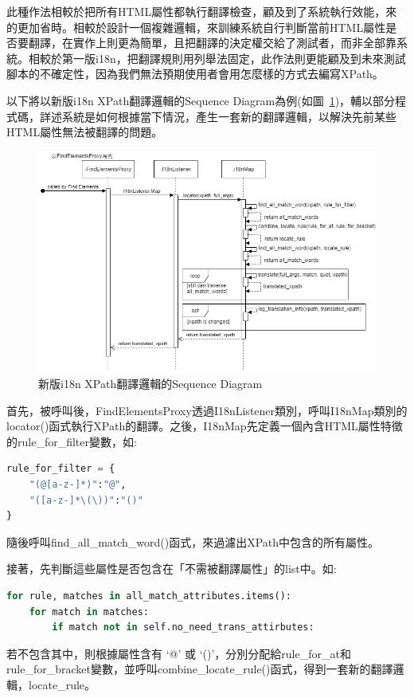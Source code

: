 此種作法相較於把所有HTML屬性都執行翻譯檢查，顧及到了系統執行效能，來的更加省時。相較於設計一個複雜邏輯，來訓練系統自行判斷當前HTML屬性是否要翻譯，在實作上則更為簡單，且把翻譯的決定權交給了測試者，而非全部靠系統。相較於第一版i18n，把翻譯規則用列舉法固定，此作法則更能顧及到未來測試腳本的不確定性，因為我們無法預期使用者會用怎麼樣的方式去編寫XPath。

以下將以新版i18n XPath翻譯邏輯的Sequence Diagram為例(如圖~\ref{新版i18n XPath翻譯邏輯的Sequence Diagram})，輔以部分程式碼，詳述系統是如何根據當下情況，產生一套新的翻譯邏輯，以解決先前某些HTML屬性無法被翻譯的問題。

\begin{figure}[H]
    \includegraphics[width= 1.1\textwidth]{../UML/i18n sequence diagram-xpath翻譯邏輯.png}
    \caption{新版i18n XPath翻譯邏輯的Sequence Diagram}
    \label{新版i18n XPath翻譯邏輯的Sequence Diagram}
\end{figure}

首先，被呼叫後，FindElementsProxy透過I18nListener類別，呼叫I18nMap類別的locator()函式執行XPath的翻譯。之後，I18nMap先定義一個內含HTML屬性特徵的rule\_for\_filter變數，如:
\begin{lstlisting}[language={python}]
rule_for_filter = {
    "(@[a-z-]*)":"@",
    "([a-z-]*\(\))":"()"
}
\end{lstlisting}
隨後呼叫find\_all\_match\_word()函式，來過濾出XPath中包含的所有屬性。

接著，先判斷這些屬性是否包含在「不需被翻譯屬性」的list中。如:
\begin{lstlisting}[language={python}]
for rule, matches in all_match_attributes.items():
    for match in matches:
        if match not in self.no_need_trans_attirbutes:
\end{lstlisting}
若不包含其中，則根據屬性含有 ‘@’ 或 ‘()’，分別分配給rule\_for\_at和rule\_for\_bracket變數，並呼叫combine\_locate\_rule()函式，得到一套新的翻譯邏輯，locate\_rule。

